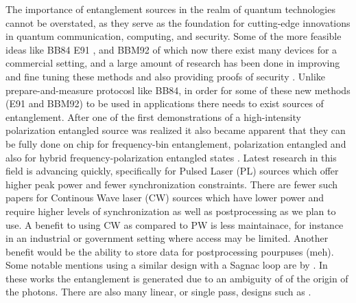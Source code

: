 \documentclass{article}
\theoremstyle{mytheoremstyle}
\theoremstyle{mytheoremstyle}
\theoremstyle{myproblemstyle}
\begin{document}
The importance of entanglement sources in the realm of quantum technologies cannot be overstated,
as they serve as the foundation for cutting-edge innovations in quantum communication, computing, and security.
Some of the more feasible ideas like BB84 \cite{BB84} E91 \cite{E91}, and BBM92 \cite{Bennett_Brassard_Mermin_1992} of which now there exist many
devices for a commercial setting, and a large amount of research has been done in improving and fine tuning these methods and 
also providing proofs of security \cite{Rusca_Boaron_Curty_Martin_Zbinden_2018,Rusca_Boaron_Grünenfelder_Martin_Zbinden_2018}.
Unlike prepare-and-measure protocosl like BB84, in order for some of these new methods (E91 and BBM92)
to be used in applications there needs to exist sources of entanglement. After one of the first \cite{Kwiat_1995} demonstrations of a high-intensity
polarization entangled source was realized it also became apparent that they can be fully done on chip \cite{S_G_S_C_F_B_L_G_B_2022} for
frequency-bin entanglement, polarization entangled \cite{L_Z_F_F_L_L_W_R_D_X_etal._2017} and also for hybrid frequency-polarization
entangled states \cite{F_R_D_F_L_M_A_B_D_2023}. Latest research in this field is advancing quickly, specifically for Pulsed Laser (PL) sources which offer higher peak
power and fewer synchronization constraints. 
There are fewer such papers for Continous Wave laser (CW) sources which have lower power and require higher levels of synchronization as
well as postprocessing as we plan to use. A benefit to using CW as compared to PW is less maintainace, for instance in an industrial or government
setting where access may be limited. Another benefit would be the ability to store data for postprocessing pourpuses (meh).
Some notable mentions using a similar design with a Sagnac loop are by
\cite{Neumann_Buchner_Bulla_Bohmann_Ursin_2022_PW,Chen_Ecker_Wengerowsky_Bulla_Joshi_Steinlechner_Ursin_2018_CW}.
In these works the entanglement is generated due to an ambiguity of of the origin of the photons.
There are also many linear, or single pass, designs such as \cite{Lee_Kim_Cha_Moon_2016,Kwiat_Mattle_Weinfurter_Zeilinger_Sergienko_Shih_1995}.
\end{document}
